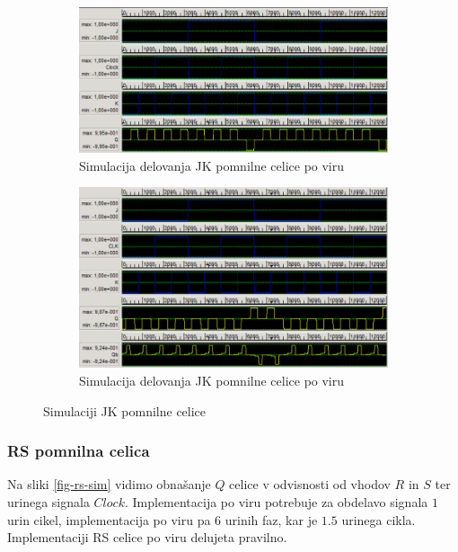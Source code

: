 \documentclass[a4paper, 11pt]{article}
\begin{document}
\begin{figure}[h!]
	\begin{subfigure}[b]{\textwidth}
	\includegraphics[width=\textwidth]{../img/vir_4/sim_jk.png}
	\caption{Simulacija delovanja JK pomnilne celice po viru \cite{quantum_dot}}
	\label{fig-jk-1-sim}
	\end{subfigure}
	\begin{subfigure}[b]{\textwidth}
	\includegraphics[width=\textwidth]{../img/vir_5/sim_jk.png}
	\caption{Simulacija delovanja JK pomnilne celice po viru \cite{a_novel_approach}}
	\label{fig-jk-2-sim}
	\end{subfigure}
	\caption{Simulaciji JK pomnilne celice}
	\label{fig-jk-sim}
\end{figure}

\subsubsection{RS pomnilna celica}
Na sliki \ref{fig-rs-sim} vidimo obnašanje $Q$ celice v odvisnosti od vhodov $R$ in $S$ ter urinega signala $Clock$.
Implementacija po viru \cite{quantum_dot} potrebuje za obdelavo signala $1$ urin cikel, implementacija po viru \cite{a_novel_approach} pa $6$ urinih faz, kar je $1.5$ urinega cikla.\\
Implementaciji RS celice po viru \cite{quantum_dot} delujeta pravilno.
\end{document}
